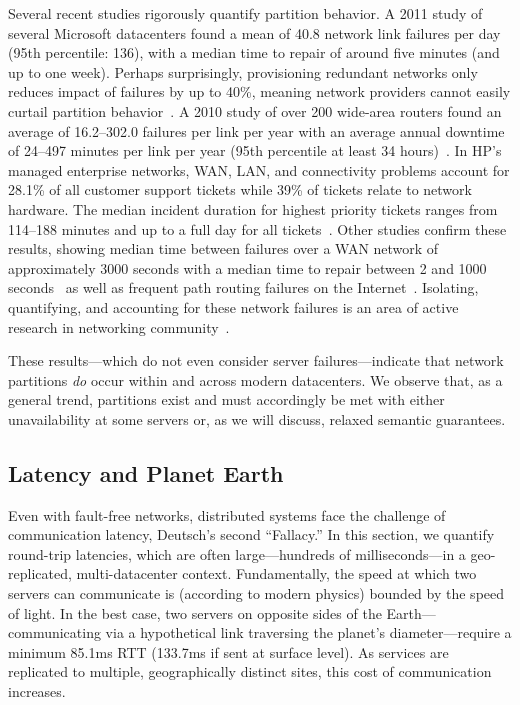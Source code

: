 Several recent studies rigorously quantify partition behavior. A 2011
study of several Microsoft datacenters found a mean of 40.8 network
link failures per day (95th percentile: 136), with a median time to
repair of around five minutes (and up to one week). Perhaps
surprisingly, provisioning redundant networks only reduces impact of
failures by up to 40\%, meaning network providers cannot easily
curtail partition behavior~\cite{sigcomm-dc}. A 2010 study of over 200
wide-area routers found an average of 16.2--302.0 failures per link
per year with an average annual downtime of 24--497 minutes per link
per year (95th percentile at least 34 hours)~\cite{sigcomm-wan}. In
HP's managed enterprise networks, WAN, LAN, and connectivity problems
account for 28.1\% of all customer support tickets while 39\% of
tickets relate to network hardware.  The median incident duration for
highest priority tickets ranges from 114--188 minutes and up to a full
day for all tickets~\cite{turner2012failure}. Other studies confirm
these results, showing median time between failures over a WAN network
of approximately 3000 seconds with a median time to repair between 2
and 1000 seconds~\cite{ip-backbone-failures} as well as frequent path
routing failures on the Internet~\cite{labovitz-failures}. Isolating,
quantifying, and accounting for these network failures is an area of
active research in networking community~\cite{uw-failure-networks}.

These results---which do not even consider server failures---indicate
that network partitions \textit{do} occur within and across modern
datacenters. We observe that, as a general trend, partitions exist and
must accordingly be met with either unavailability at some servers or,
as we will discuss, relaxed semantic guarantees.

\subsection{Latency and Planet Earth}
\label{sec:latency}

Even with fault-free networks, distributed systems face the challenge
of communication latency, Deutsch's second ``Fallacy.'' In this
section, we quantify round-trip latencies, which are often
large---hundreds of milliseconds---in a geo-replicated,
multi-datacenter context.  Fundamentally, the speed at which two
servers can communicate is (according to modern physics) bounded by
the speed of light. In the best case, two servers on opposite sides of
the Earth---communicating via a hypothetical link traversing the
planet's diameter---require a minimum 85.1ms RTT (133.7ms if sent at
surface level). As services are replicated to multiple, geographically
distinct sites, this cost of communication increases.


